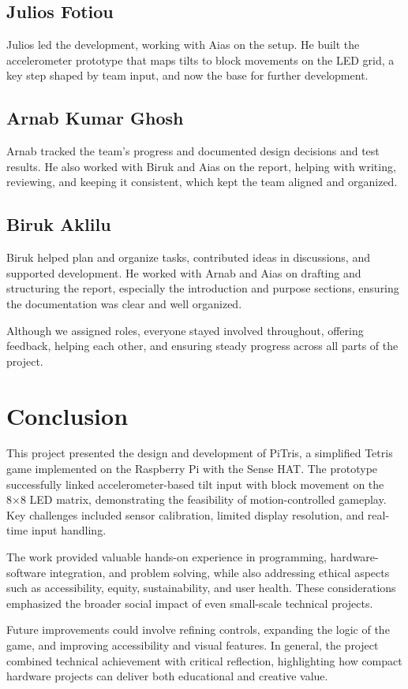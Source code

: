 \documentclass[11pt,titlepage,openright]{book}
\begin{document}
\section{Julios Fotiou}
Julios led the development, working with Aias on the setup. He built the accelerometer prototype that maps tilts to block movements on the LED grid, a key step shaped by team input, and now the base for further development.

\section{Arnab Kumar Ghosh}
Arnab tracked the team’s progress and documented design decisions and test results. He also worked with Biruk and Aias on the report, helping with writing, reviewing, and keeping it consistent, which kept the team aligned and organized. 


\section{Biruk Aklilu}
Biruk helped plan and organize tasks, contributed ideas in discussions, and supported development. He worked with Arnab and Aias on drafting and structuring the report, especially the introduction and purpose sections, ensuring the documentation was clear and well organized.

 \vspace{3ex}Although we assigned roles, everyone stayed involved throughout, offering feedback, helping each other, and ensuring steady progress across all parts of the project. 


\chapter{Conclusion}
This project presented the design and development of PiTris, a simplified Tetris game implemented on the Raspberry Pi with the Sense HAT. The prototype successfully linked accelerometer-based tilt input with block movement on the 8×8 LED matrix, demonstrating the feasibility of motion-controlled gameplay. Key challenges included sensor calibration, limited display resolution, and real-time input handling.

The work provided valuable hands-on experience in programming, hardware-software integration, and problem solving, while also addressing ethical aspects such as accessibility, equity, sustainability, and user health. These considerations emphasized the broader social impact of even small-scale technical projects.

Future improvements could involve refining controls, expanding the logic of the game, and improving accessibility and visual features. In general, the project combined technical achievement with critical reflection, highlighting how compact hardware projects can deliver both educational and creative value.




\end{document}
